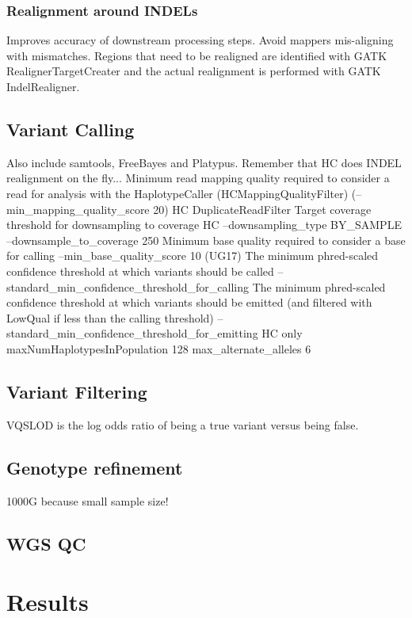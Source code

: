 \subsubsection{Realignment around INDELs}
Improves accuracy of downstream processing steps. Avoid mappers mis-aligning with mismatches. Regions that need to be realigned are identified with GATK RealignerTargetCreater and the actual realignment is performed with GATK IndelRealigner.
\subsection{Variant Calling}
Also include samtools, FreeBayes and Platypus.
Remember that HC does INDEL realignment on the fly...
Minimum read mapping quality required to consider a read for analysis with the HaplotypeCaller (HCMappingQualityFilter) (--min_mapping_quality_score 20)
HC DuplicateReadFilter
Target coverage threshold for downsampling to coverage HC --downsampling_type BY_SAMPLE --downsample_to_coverage 250
Minimum base quality required to consider a base for calling --min_base_quality_score 10 (UG17)
The minimum phred-scaled confidence threshold at which variants should be called --standard_min_confidence_threshold_for_calling
The minimum phred-scaled confidence threshold at which variants should be emitted (and filtered with LowQual if less than the calling threshold) --standard_min_confidence_threshold_for_emitting
HC only maxNumHaplotypesInPopulation 128
max_alternate_alleles 6
\subsection{Variant Filtering}
VQSLOD is the log odds ratio of being a true variant versus being false.
\subsection{Genotype refinement}
1000G because small sample size!
\subsection{WGS QC}
\section{Results}
